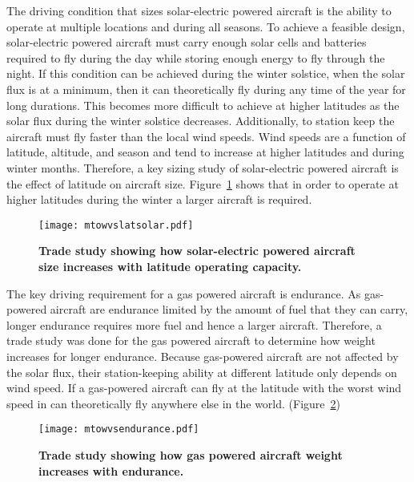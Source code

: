 \documentclass[]{aiaa-tc}%
\begin{document}
The driving condition that sizes solar-electric powered aircraft is the ability to operate at multiple locations and during all seasons.  
To achieve a feasible design, solar-electric powered aircraft must carry enough solar cells and batteries required to fly during the day while storing enough energy to fly through the night.\cite{solartech}
If this condition can be achieved during the winter solstice, when the solar flux is at a minimum, then it can theoretically fly during any time of the year for long durations. \cite{solartech}
This becomes more difficult to achieve at higher latitudes as the solar flux during the winter solstice decreases.  
Additionally, to station keep the aircraft must fly faster than the local wind speeds.  
Wind speeds are a function of latitude, altitude, and season and tend to increase at higher latitudes and during winter months. 
Therefore, a key sizing study of solar-electric powered aircraft is the effect of latitude on aircraft size.  
Figure~\ref{f:solarstart} shows that in order to operate at higher latitudes during the winter a larger aircraft is required. 

\begin{figure}[H]
	\begin{center}
	\texttt{[image: mtowvslatsolar.pdf]}
    \caption{ \textbf{ Trade study showing how solar-electric powered aircraft size increases with latitude operating capacity.  }}
	\label{f:solarstart}
	\end{center}
\end{figure}

The key driving requirement for a gas powered aircraft is endurance.  
As gas-powered aircraft are endurance limited by the amount of fuel that they can carry, longer endurance requires more fuel and hence a larger aircraft.  
Therefore, a trade study was done for the gas powered aircraft to determine how weight increases for longer endurance.
Because gas-powered aircraft are not affected by the solar flux, their station-keeping ability at different latitude only depends on wind speed. 
If a gas-powered aircraft can fly at the latitude with the worst wind speed in can theoretically fly anywhere else in the world.  
 (Figure~\ref{f:mtowvsendurance}) 

\begin{figure}[H]
	\begin{center}
	\texttt{[image: mtowvsendurance.pdf]}
    \caption{ \textbf{ Trade study showing how gas powered aircraft weight increases with endurance.  }}
	\label{f:mtowvsendurance}
	\end{center}
\end{figure}
\end{document}
